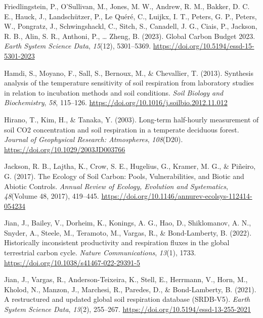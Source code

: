 \documentclass[
  letterpaper,
  DIV=11,
  numbers=noendperiod]{scrartcl}
\newlength{\cslhangindent}
\newenvironment{CSLReferences}[2] %
 {\begin{list}{}{%
  \setlength{\itemindent}{0pt}
  \setlength{\leftmargin}{0pt}
  \setlength{\parsep}{0pt}
  \ifodd #1
   \setlength{\leftmargin}{\cslhangindent}
   \setlength{\itemindent}{-1\cslhangindent}
  \fi
  \setlength{\itemsep}{#2\baselineskip}}}
 {\end{list}}
\begin{document}
\begin{CSLReferences}{1}{0}
Friedlingstein, P., O'Sullivan, M., Jones, M. W., Andrew, R. M., Bakker,
D. C. E., Hauck, J., Landschützer, P., Le Quéré, C., Luijkx, I. T.,
Peters, G. P., Peters, W., Pongratz, J., Schwingshackl, C., Sitch, S.,
Canadell, J. G., Ciais, P., Jackson, R. B., Alin, S. R., Anthoni, P.,
\ldots{} Zheng, B. (2023). Global {Carbon Budget} 2023. \emph{Earth
System Science Data}, \emph{15}(12), 5301--5369.
\url{https://doi.org/10.5194/essd-15-5301-2023}

Hamdi, S., Moyano, F., Sall, S., Bernoux, M., \& Chevallier, T. (2013).
Synthesis analysis of the temperature sensitivity of soil respiration
from laboratory studies in relation to incubation methods and soil
conditions. \emph{Soil Biology and Biochemistry}, \emph{58}, 115--126.
\url{https://doi.org/10.1016/j.soilbio.2012.11.012}

Hirano, T., Kim, H., \& Tanaka, Y. (2003). Long-term half-hourly
measurement of soil {CO2} concentration and soil respiration in a
temperate deciduous forest. \emph{Journal of Geophysical Research:
Atmospheres}, \emph{108}(D20).
\url{https://doi.org/10.1029/2003JD003766}

Jackson, R. B., Lajtha, K., Crow, S. E., Hugelius, G., Kramer, M. G., \&
Piñeiro, G. (2017). The {Ecology} of {Soil Carbon}: {Pools},
{Vulnerabilities}, and {Biotic} and {Abiotic Controls}. \emph{Annual
Review of Ecology, Evolution and Systematics}, \emph{48}(Volume 48,
2017), 419--445.
\url{https://doi.org/10.1146/annurev-ecolsys-112414-054234}

Jian, J., Bailey, V., Dorheim, K., Konings, A. G., Hao, D., Shiklomanov,
A. N., Snyder, A., Steele, M., Teramoto, M., Vargas, R., \&
Bond-Lamberty, B. (2022). Historically inconsistent productivity and
respiration fluxes in the global terrestrial carbon cycle. \emph{Nature
Communications}, \emph{13}(1), 1733.
\url{https://doi.org/10.1038/s41467-022-29391-5}

Jian, J., Vargas, R., Anderson-Teixeira, K., Stell, E., Herrmann, V.,
Horn, M., Kholod, N., Manzon, J., Marchesi, R., Paredes, D., \&
Bond-Lamberty, B. (2021). A restructured and updated global soil
respiration database ({SRDB-V5}). \emph{Earth System Science Data},
\emph{13}(2), 255--267. \url{https://doi.org/10.5194/essd-13-255-2021}


\end{CSLReferences}
\end{document}
